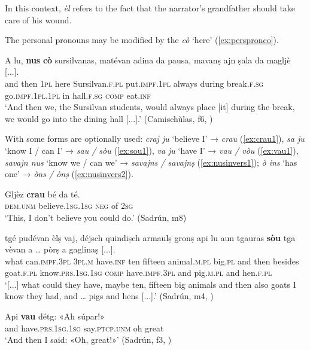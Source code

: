 In this context, \textit{èl} refers to the fact that the narrator's grandfather should take care of his wound.

The  personal pronouns may be modified by the  \textit{cò} `here' (\ref{ex:perspronco}).

\ea
\label{ex:perspronco}
\gll A lu, \textbf{nus} \textbf{cò} sursilvanas, matévan adina da pausa, mavanṣ ajn ṣala da magljè [...].\\
and then \textsc{1pl} here Sursilvan.\textsc{f.pl} put.\textsc{impf.1pl} always during break.\textsc{f.sg} go.\textsc{impf.1pl.1pl} in hall.\textsc{f.sg} \textsc{comp} eat.\textsc{inf}\\
\glt `And then we, the Sursilvan students, would always place [it] during the break, we would go into the dining hall [...].' (Camischùlas, f6, )
\z

With  some  forms are optionally used: \textit{craj ju} `believe I' → \textit{crau}  (\ref{ex:crau1}), \textit{sa ju} `know I / can I' → \textit{sau / sòu} (\ref{ex:sou1}), \textit{va ju} `have I' → \textit{vau / vòu} (\ref{ex:vau1}), \textit{savajn nus} `know we / can we' → \textit{savajns / savajnṣ} (\ref{ex:nusinvers1}); \textit{ò ins} `has one' → \textit{òns / ònṣ} (\ref{ex:nusinvers2}).

\ea
\label{ex:crau1}
\gll Gljèz \textbf{crau} bé da té.\\
\textsc{dem.unm} believe.\textsc{1sg.1sg} \textsc{neg} of \textsc{2sg}\\
\glt `This, I don't believe you could do.' (Sadrún, m8)
\z

\ea
\label{ex:sou1}
\gll   [...] tgé pudévan èlṣ vaj, déjsch quindiṣch armaulṣ gronṣ api lu aun tgauras \textbf{sòu} tga vèvan a … pòrṣ a gaglinaṣ [...]. \\
{} what can.\textsc{impf.3pl} \textsc{3pl.m} have.\textsc{inf} ten fifteen animal.\textsc{m.pl} big.\textsc{pl} and then besides goat.\textsc{f.pl} know.\textsc{prs.1sg.1sg} \textsc{comp} have.\textsc{impf.3pl} and {} pig.\textsc{m.pl} and hen.\textsc{f.pl}\\
\glt `[...] what could they have, maybe ten, fifteen big animals and then also goats I know they had, and … pigs and hens [...].' (Sadrún, m4, )
\z

\ea
\label{ex:vau1}
\gll Api \textbf{vau} détg: «Ah súpar!»   \\
and have.\textsc{prs.1sg.1sg} say.\textsc{ptcp.unm} oh great\\
\glt `And then I said: «Oh, great!»' (Sadrún, f3, )
\z

